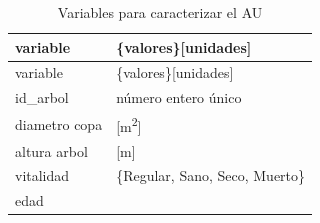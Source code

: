\documentclass[12pt,a4paper,oneside, openany]{book}
\theoremstyle{definition}
\theoremstyle{definition}
\theoremstyle{definition}
\theoremstyle{remark}
\begin{document}
\begin{longtable}[]{@{}ll@{}}
\caption{\label{tab:vars-AU} Variables para caracterizar el
AU}\tabularnewline
\toprule
\begin{minipage}[b]{0.30\columnwidth}\raggedright\strut
variable\strut
\end{minipage} & \begin{minipage}[b]{0.42\columnwidth}\raggedright\strut
\{valores\}{[}unidades{]}\strut
\end{minipage}\tabularnewline
\midrule
\endfirsthead
\toprule
\begin{minipage}[b]{0.30\columnwidth}\raggedright\strut
variable\strut
\end{minipage} & \begin{minipage}[b]{0.42\columnwidth}\raggedright\strut
\{valores\}{[}unidades{]}\strut
\end{minipage}\tabularnewline
\midrule
\endhead
\begin{minipage}[t]{0.30\columnwidth}\raggedright\strut
id\_arbol\strut
\end{minipage} & \begin{minipage}[t]{0.42\columnwidth}\raggedright\strut
número entero único\strut
\end{minipage}\tabularnewline
\begin{minipage}[t]{0.30\columnwidth}\raggedright\strut
diametro copa\strut
\end{minipage} & \begin{minipage}[t]{0.42\columnwidth}\raggedright\strut
{[}m\textsuperscript{2}{]}\strut
\end{minipage}\tabularnewline
\begin{minipage}[t]{0.30\columnwidth}\raggedright\strut
altura arbol\strut
\end{minipage} & \begin{minipage}[t]{0.42\columnwidth}\raggedright\strut
{[}m{]}\strut
\end{minipage}\tabularnewline
\begin{minipage}[t]{0.30\columnwidth}\raggedright\strut
vitalidad\strut
\end{minipage} & \begin{minipage}[t]{0.42\columnwidth}\raggedright\strut
\{Regular, Sano, Seco, Muerto\}\strut
\end{minipage}\tabularnewline
\begin{minipage}[t]{0.30\columnwidth}\raggedright\strut
edad\strut
\end{minipage} & \begin{minipage}[t]{0.42\columnwidth}\raggedright\strut

\end{minipage}
\end{longtable}
\end{document}
